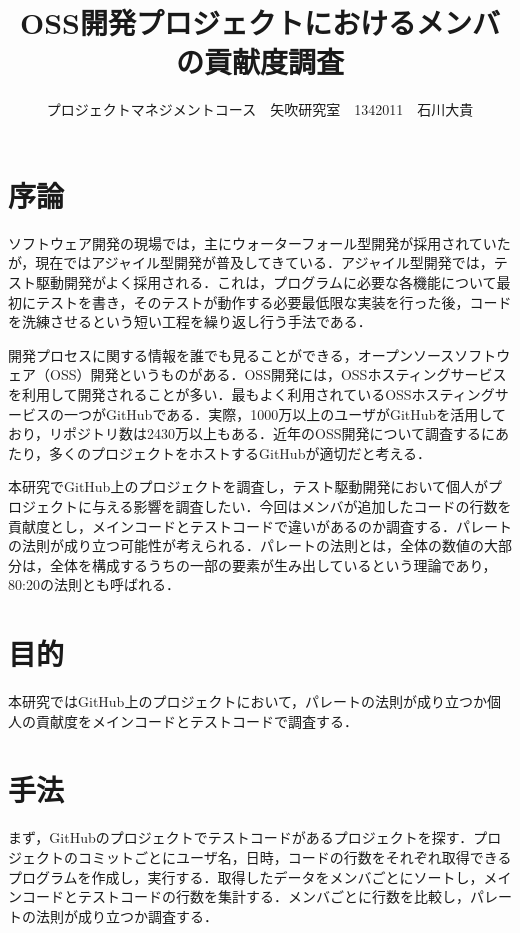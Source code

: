 \documentclass[uplatex,twocolumn,dvipdfmx]{jsarticle}
\title{\vspace{-5mm}\fontsize{14pt}{0pt}\selectfont OSS開発プロジェクトにおけるメンバの貢献度調査}
\author{\normalsize プロジェクトマネジメントコース　矢吹研究室　1342011　石川大貴}
\date{}
\begin{document}
\fontsize{10.5pt}{\baselineskip}\selectfont
\maketitle





\section{序論}

ソフトウェア開発の現場では，主にウォーターフォール型開発が採用されていたが，現在ではアジャイル型開発が普及してきている．アジャイル型開発では，テスト駆動開発がよく採用される．これは，プログラムに必要な各機能について最初にテストを書き，そのテストが動作する必要最低限な実装を行った後，コードを洗練させるという短い工程を繰り返し行う手法である\cite{shimizu2012}．

開発プロセスに関する情報を誰でも見ることができる，オープンソースソフトウェア（OSS）開発というものがある．OSS開発には，OSSホスティングサービスを利用して開発されることが多い．最もよく利用されているOSSホスティングサービスの一つがGitHubである．実際，1000万以上のユーザがGitHubを活用しており，リポジトリ数は2430万以上もある\cite{github}．近年のOSS開発について調査するにあたり，多くのプロジェクトをホストするGitHubが適切だと考える．

本研究でGitHub上のプロジェクトを調査し，テスト駆動開発において個人がプロジェクトに与える影響を調査したい．今回はメンバが追加したコードの行数を貢献度とし，メインコードとテストコードで違いがあるのか調査する．パレートの法則が成り立つ可能性が考えられる．パレートの法則とは，全体の数値の大部分は，全体を構成するうちの一部の要素が生み出しているという理論であり，80:20の法則とも呼ばれる．


\section{目的}

本研究ではGitHub上のプロジェクトにおいて，パレートの法則が成り立つか個人の貢献度をメインコードとテストコードで調査する．


\section{手法}

まず，GitHubのプロジェクトでテストコードがあるプロジェクトを探す．プロジェクトのコミットごとにユーザ名，日時，コードの行数をそれぞれ取得できるプログラムを作成し，実行する．取得したデータをメンバごとにソートし，メインコードとテストコードの行数を集計する．メンバごとに行数を比較し，パレートの法則が成り立つか調査する．
\end{document}
